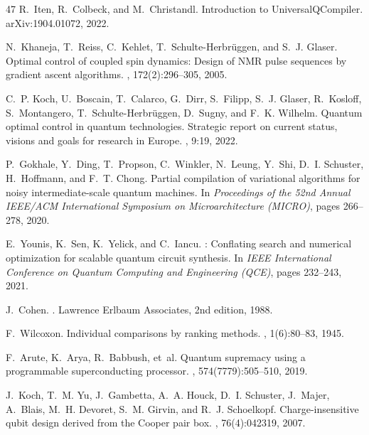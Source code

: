 \documentclass[sigconf,nonacm]{acmart}
\begin{document}
\begin{thebibliography}{47}
R.~Iten, R.~Colbeck, and M.~Christandl.
\newblock Introduction to {UniversalQCompiler}.
\newblock arXiv:1904.01072, 2022.

N.~Khaneja, T.~Reiss, C.~Kehlet, T.~Schulte-Herbr{\"u}ggen, and S.~J. Glaser.
\newblock Optimal control of coupled spin dynamics: Design of {NMR} pulse sequences by gradient ascent algorithms.
, 172(2):296--305, 2005.

C.~P. Koch, U.~Boscain, T.~Calarco, G.~Dirr, S.~Filipp, S.~J. Glaser, R.~Kosloff, S.~Montangero, T.~Schulte-Herbr{\"u}ggen, D.~Sugny, and F.~K. Wilhelm.
\newblock Quantum optimal control in quantum technologies. {S}trategic report on current status, visions and goals for research in {E}urope.
, 9:19, 2022.

P.~Gokhale, Y.~Ding, T.~Propson, C.~Winkler, N.~Leung, Y.~Shi, D.~I. Schuster, H.~Hoffmann, and F.~T. Chong.
\newblock Partial compilation of variational algorithms for noisy intermediate-scale quantum machines.
\newblock In {\em Proceedings of the 52nd Annual IEEE/ACM International Symposium on Microarchitecture (MICRO)}, pages 266--278, 2020.

E.~Younis, K.~Sen, K.~Yelick, and C.~Iancu.
: Conflating search and numerical optimization for scalable quantum circuit synthesis.
\newblock In {\em IEEE International Conference on Quantum Computing and Engineering (QCE)}, pages 232--243, 2021.

J.~Cohen.
.
\newblock Lawrence Erlbaum Associates, 2nd edition, 1988.

F.~Wilcoxon.
\newblock Individual comparisons by ranking methods.
, 1(6):80--83, 1945.


F.~Arute, K.~Arya, R.~Babbush, et~al.
\newblock Quantum supremacy using a programmable superconducting processor.
, 574(7779):505--510, 2019.

J.~Koch, T.~M. Yu, J.~Gambetta, A.~A. Houck, D.~I. Schuster, J.~Majer, A.~Blais, M.~H. Devoret, S.~M. Girvin, and R.~J. Schoelkopf.
\newblock Charge-insensitive qubit design derived from the {C}ooper pair box.
, 76(4):042319, 2007.


\end{thebibliography}
\end{document}
